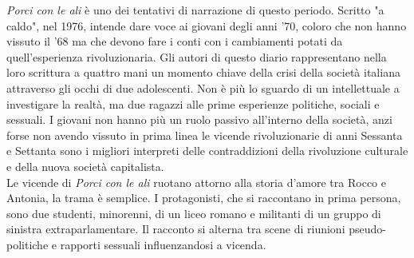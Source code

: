 \textit{Porci con le ali} è uno dei tentativi di narrazione di questo periodo.
Scritto "a caldo", nel 1976, intende dare voce ai giovani degli anni '70, coloro che non hanno vissuto il '68 ma che devono fare i conti con i cambiamenti potati da quell'esperienza rivoluzionaria.
Gli autori di questo diario rappresentano nella loro scrittura a quattro mani un momento chiave della crisi della società italiana attraverso gli occhi di due adolescenti.
Non è più lo sguardo di un intellettuale a investigare la realtà, ma due ragazzi alle prime esperienze politiche, sociali e sessuali.
I giovani non hanno più un ruolo passivo all'interno della società, anzi forse non avendo vissuto in prima linea le vicende rivoluzionarie di anni Sessanta e Settanta sono i migliori interpreti delle contraddizioni della rivoluzione culturale e della nuova società capitalista.
\\Le vicende di \textit{Porci con le ali} ruotano attorno alla storia d'amore tra Rocco e Antonia, la trama è semplice.
I protagonisti, che si raccontano in prima persona, sono due studenti, minorenni, di un liceo romano e militanti di un gruppo di sinistra extraparlamentare.
Il racconto si alterna tra scene di riunioni pseudo-politiche e rapporti sessuali influenzandosi a vicenda. 

